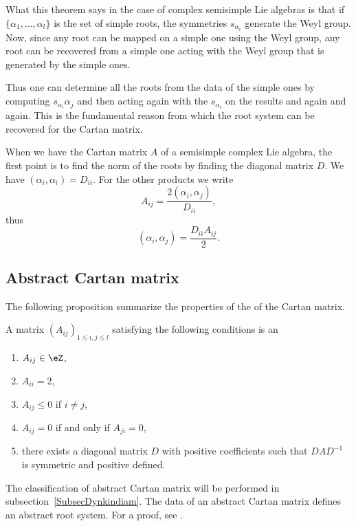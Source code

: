What this theorem says in the case of complex semisimple Lie algebras is that if \( \{ \alpha_1,\ldots,\alpha_l \}\) is the set of simple roots, the symmetries \( s_{\alpha_i}\) generate the Weyl group. Now, since any root can be mapped on a simple one using the Weyl group, any root can be recovered from a simple one acting with the Weyl group that is generated by the simple ones.

Thus one can determine all the roots from the data of the simple ones by computing \( s_{\alpha_i}\alpha_j\) and then acting again with the \( s_{\alpha_i}\) on the results and again and again. This is the fundamental reason from which the root system can be recovered for the Cartan matrix.


When we have the Cartan matrix \( A \) of a semisimple complex Lie algebra, the first point is to find the norm of the roots by finding the diagonal matrix \( D\). We have \( (\alpha_i,\alpha_i)=D_{ii}\). For the other products we write
\begin{equation}
    A_{ij}=\frac{ 2(\alpha_i,\alpha_j) }{ D_{ii} },
\end{equation}
thus
\begin{equation}
    (\alpha_i,\alpha_j)=\frac{ D_{ii}A_{ij} }{ 2 }.
\end{equation}

\subsection{Abstract Cartan matrix}

The following proposition summarize the properties of the of the Cartan matrix.
\begin{definition}      \label{DeabstrCartanmatr}
    A matrix \( (A_{ij})_{1\leq i,j\leq l}\) satisfying the following conditions is an 
    \begin{enumerate}
        \item
            \( A_{ij}\in\eZ\),
        \item
            \( A_{ii}=2\),
        \item   \label{ItempoprCartaniii}
            \( A_{ij}\leq 0\) if \( i\neq j\),
        \item
            \( A_{ij}=0\) if and only if \( A_{ji}=0\),
        \item\label{ItempoprCartanv}
            there exists a diagonal matrix \( D\) with positive coefficients such that \( DAD^{-1}\) is symmetric and positive defined.
    \end{enumerate}
\end{definition}
The classification of abstract Cartan matrix will be performed in subsection~\ref{SubsecDynkindiam}. The data of an abstract Cartan matrix defines an abstract root system. For a proof, see \cite{CartanRootProject}.


